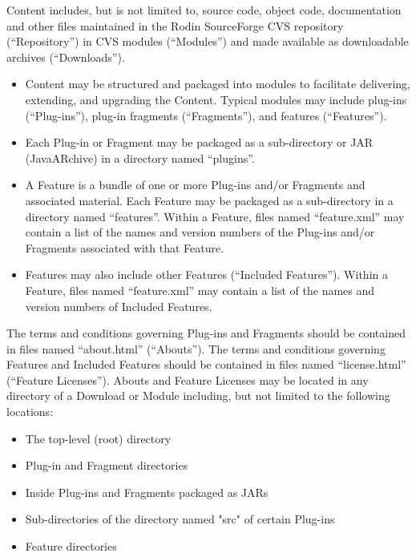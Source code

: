 Content includes, but is not limited to, source code, object code, documentation and other files maintained in the Rodin SourceForge CVS repository (``Repository'') in CVS modules (``Modules'') and made available as downloadable archives (``Downloads'').
\begin{itemize}
\item Content may be structured and packaged into modules to facilitate delivering, extending, and upgrading the Content. Typical modules may include plug-ins (``Plug-ins''), plug-in fragments (``Fragments''), and features (``Features'').

\item Each Plug-in or Fragment may be packaged as a sub-directory or JAR (Java\texttrademark ARchive) in a directory named ``plugins''.

\item A Feature is a bundle of one or more Plug-ins and/or Fragments and associated material. Each Feature may be packaged as a sub-directory in a directory named ``features''. Within a Feature, files named ``feature.xml'' may contain a list of the names and version numbers of the Plug-ins and/or Fragments associated with that Feature.

\item Features may also include other Features (``Included Features''). Within a Feature, files named ``feature.xml'' may contain a list of the names and version numbers of Included Features.
\end{itemize}

The terms and conditions governing Plug-ins and Fragments should be contained in files named ``about.html'' (``Abouts''). The terms and conditions governing Features and Included Features should be contained in files named ``license.html'' (``Feature Licenses''). Abouts and Feature Licenses may be located in any directory of a Download or Module including, but not limited to the following locations:
\begin{itemize}
\item The top-level (root) directory

\item Plug-in and Fragment directories

\item Inside Plug-ins and Fragments packaged as JARs

\item Sub-directories of the directory named "src" of certain Plug-ins

\item Feature directories
\end{itemize}

